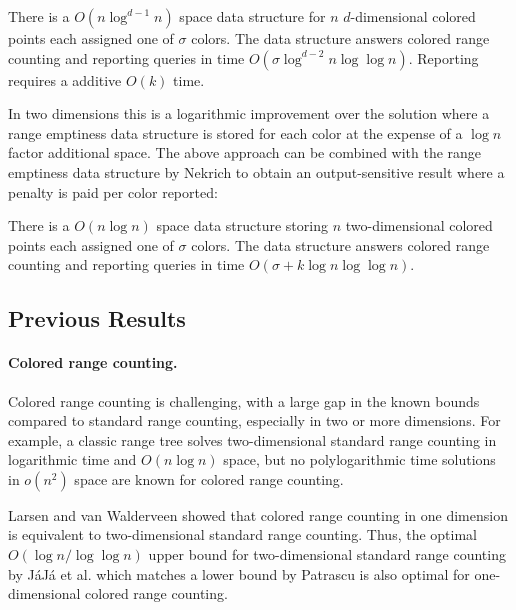 \begin{corollary}\label{thm:col-dD}
    There is a $O(n \log ^{d-1} n)$ space data structure for $n$ $d$-dimensional colored points each assigned one of $\sigma$ colors. The data structure answers colored range counting and reporting queries in time $O(\sigma \log ^{d-2} n \log \log n)$. Reporting requires a additive $O(k)$ time.
\end{corollary}

In two dimensions this is a logarithmic improvement over the solution where a range emptiness data structure is stored for each color at the expense of a $\log n$ factor additional space. The above approach can be combined with the range emptiness data structure by Nekrich \cite{nekrich2009orthogonal} to obtain an output-sensitive result where a penalty is paid per color reported:

\begin{corollary}\label{thm:col-2D}
    There is a $O(n \log n)$ space data structure storing $n$ two-dimensional colored points each assigned one of $\sigma$ colors. The data structure answers colored range counting and reporting queries in time $O(\sigma + k \log n \log \log n)$.
\end{corollary}

\subsection{Previous Results}
\label{sub:previous-results}
\paragraph*{Colored range counting.}
%
Colored range counting is challenging, with a large gap in the known bounds compared to standard range counting, especially in two or more dimensions. For example, a classic range tree solves two-dimensional standard range counting in logarithmic time and $O(n \log n)$ space, but no polylogarithmic time solutions in $o(n^2)$ space are known for colored range counting.

Larsen and van Walderveen \cite{larsen2013near, gupta1995further} showed that colored range counting in one dimension is equivalent to two-dimensional standard range counting. Thus, the optimal $O(\log n / \log \log n)$ upper bound for two-dimensional standard range counting by J{\'a}J{\'a} et al. \cite{jaja2005space} which matches a lower bound by Patrascu \cite{patrascu2007lower} is also optimal for one-dimensional colored range counting.


